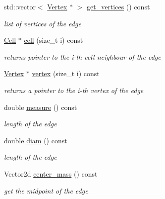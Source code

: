 \begin{DoxyCompactItemize}
\mbox{\label{classHArDCore2D_1_1Edge_a5315c7fa0058509166d75175660ed542}} 
std\+::vector$<$ \hyperlink{classHArDCore2D_1_1Vertex}{Vertex} $\ast$ $>$ \hyperlink{classHArDCore2D_1_1Edge_a5315c7fa0058509166d75175660ed542}{get\+\_\+vertices} () const
\begin{DoxyCompactList}\small\item\em list of vertices of the edge \end{DoxyCompactList}\item 
\mbox{\label{classHArDCore2D_1_1Edge_ad4be0bfb981ccf2c1e02e870772dbdc3}} 
\hyperlink{classHArDCore2D_1_1Cell}{Cell} $\ast$ \hyperlink{classHArDCore2D_1_1Edge_ad4be0bfb981ccf2c1e02e870772dbdc3}{cell} (size\+\_\+t i) const
\begin{DoxyCompactList}\small\item\em returns pointer to the i-\/th cell neighbour of the edge \end{DoxyCompactList}\item 
\mbox{\label{classHArDCore2D_1_1Edge_ade257bc049ec1f43751fc647e07ec052}} 
\hyperlink{classHArDCore2D_1_1Vertex}{Vertex} $\ast$ \hyperlink{classHArDCore2D_1_1Edge_ade257bc049ec1f43751fc647e07ec052}{vertex} (size\+\_\+t i) const
\begin{DoxyCompactList}\small\item\em returns a pointer to the i-\/th vertex of the edge \end{DoxyCompactList}\item 
double \hyperlink{classHArDCore2D_1_1Edge_a6c00cbb57ddc2e80e3c07849eadc68a8}{measure} () const
\begin{DoxyCompactList}\small\item\em length of the edge \end{DoxyCompactList}\item 
double \hyperlink{classHArDCore2D_1_1Edge_ad558804a7493cb6a6d968f48bb4f4742}{diam} () const
\begin{DoxyCompactList}\small\item\em length of the edge \end{DoxyCompactList}\item 
Vector2d \hyperlink{group__Mesh_ga41ebc04d2b292197a02a9afd25a76a18}{center\+\_\+mass} () const
\begin{DoxyCompactList}\small\item\em get the midpoint of the edge \end{DoxyCompactList}\item 

\end{DoxyCompactItemize}
